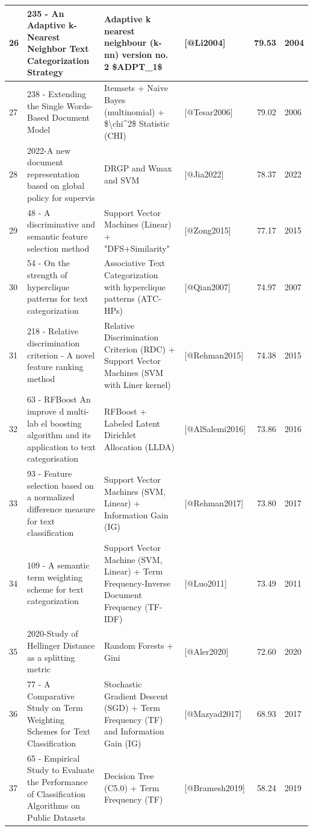 \documentclass[
]{article}
\begin{document}
\begin{table}
\begin{tabular}[t]{l|l|l|l|r|l}
\hline
26 & 235 - An Adaptive k-Nearest Neighbor Text Categorization Strategy & Adaptive k nearest neighbour (k-nn) version no. 2 \$ADPT\_1\$ & [@Li2004] & 79.53 & 2004\\
\hline
27 & 238 - Extending the Single Words-Based Document Model & Itemsets + Naive Bayes (multinomial) + \$\textbackslash{}chi\textasciicircum{}2\$ Statistic (CHI) & [@Tesar2006] & 79.02 & 2006\\
\hline
28 & 2022-A new document representation based on global policy for supervis & DRGP and Wmax and SVM & [@Jia2022] & 78.37 & 2022\\
\hline
29 & 48 - A discriminative and semantic feature selection method & Support Vector Machines (Linear) + "DFS+Similarity" & [@Zong2015] & 77.17 & 2015\\
\hline
30 & 54 - On the strength of hyperclique patterns for text categorization & Associative Text Categorization with hyperclique patterns (ATC-HPs) & [@Qian2007] & 74.97 & 2007\\
\hline
31 & 218 - Relative discrimination criterion - A novel feature ranking method & Relative Discrimination Criterion (RDC) + Support Vector Machines (SVM with Liner kernel) & [@Rehman2015] & 74.38 & 2015\\
\hline
32 & 63 - RFBoost An improve d multi-lab el boosting algorithm and its application to text categorisation & RFBoost +  Labeled Latent Dirichlet Allocation (LLDA) & [@AlSalemi2016] & 73.86 & 2016\\
\hline
33 & 93 - Feature selection based on a normalized difference measure for text classification & Support Vector Machines (SVM, Linear) + Information Gain (IG) & [@Rehman2017] & 73.80 & 2017\\
\hline
34 & 109 - A semantic term weighting scheme for text categorization & Support Vector Machine (SVM, Linear) + Term Frequency-Inverse Document Frequency (TF-IDF) & [@Luo2011] & 73.49 & 2011\\
\hline
35 & 2020-Study of Hellinger Distance as a splitting metric & Random Forests + Gini & [@Aler2020] & 72.60 & 2020\\
\hline
36 & 77 -  A Comparative Study on Term Weighting Schemes for Text Classification & Stochastic Gradient Descent (SGD) + Term Frequency (TF) and  Information Gain (IG) & [@Mazyad2017] & 68.93 & 2017\\
\hline
37 & 65 - Empirical Study to Evaluate the Performance of Classification Algorithms on Public Datasets & Decision Tree (C5.0) +  Term Frequency (TF) & [@Bramesh2019] & 58.24 & 2019\\
\hline
\end{tabular}
\end{table}
\end{document}
